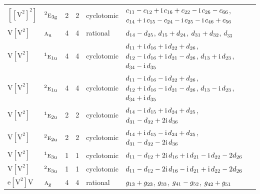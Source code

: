 \documentclass[10pt,a4paper]{article}
\numberwithin{equation}{section}
\newcommand{\irr}[1]{\text{\normalfont\scshape #1}}
\newcommand{\conjpair}[1]{{}^{#1}}
\newcommand{\ptag}[1]{\mathrm{#1}}
\newcommand{\iunit}{\mathrm{i}}
\newcommand{\jahn}[1]{\mathrm{#1}}
\newlength{\fillwidth}\newlength{\cellwidth}\newlength{\colwidth}
\newcommand{\signbreak}{\penalty100\relax}
\begin{document}
{\begin{longtable}{@{}llrrl>{\RaggedRight\arraybackslash}p{\fillwidth}@{}}
$\jahn{[[V^{2}]^{2}]}$ & $\conjpair{2}\irr{e}_{3\ptag{g}}$ & 2 & 2 & cyclotomic & $c_{11} -\signbreak c_{12} +\signbreak \iunit{}\,c_{16} +\signbreak c_{22} -\signbreak \iunit{}\,c_{26} -\signbreak c_{66}$, $c_{14} +\signbreak \iunit{}\,c_{15} -\signbreak c_{24} -\signbreak \iunit{}\,c_{25} -\signbreak \iunit{}\,c_{46} +\signbreak c_{56}$\\
$\jahn{V[V^{2}]}$ & $\irr{a}_{\ptag{u}}$ & 4 & 4 & rational & $d_{14} -\signbreak d_{25}$, $d_{15} +\signbreak d_{24}$, $d_{31} +\signbreak d_{32}$, $d_{33}$\\
$\jahn{V[V^{2}]}$ & $\conjpair{1}\irr{e}_{1\ptag{u}}$ & 4 & 4 & cyclotomic & $d_{11} +\signbreak \iunit{}\,d_{16} +\signbreak \iunit{}\,d_{22} +\signbreak d_{26}$, $d_{12} -\signbreak \iunit{}\,d_{16} +\signbreak \iunit{}\,d_{21} -\signbreak d_{26}$, $d_{13} +\signbreak \iunit{}\,d_{23}$, $d_{34} -\signbreak \iunit{}\,d_{35}$\\
$\jahn{V[V^{2}]}$ & $\conjpair{2}\irr{e}_{1\ptag{u}}$ & 4 & 4 & cyclotomic & $d_{11} -\signbreak \iunit{}\,d_{16} -\signbreak \iunit{}\,d_{22} +\signbreak d_{26}$, $d_{12} +\signbreak \iunit{}\,d_{16} -\signbreak \iunit{}\,d_{21} -\signbreak d_{26}$, $d_{13} -\signbreak \iunit{}\,d_{23}$, $d_{34} +\signbreak \iunit{}\,d_{35}$\\
$\jahn{V[V^{2}]}$ & $\conjpair{1}\irr{e}_{2\ptag{u}}$ & 2 & 2 & cyclotomic & $d_{14} -\signbreak \iunit{}\,d_{15} +\signbreak \iunit{}\,d_{24} +\signbreak d_{25}$, $d_{31} -\signbreak d_{32} +\signbreak 2\iunit{}\,d_{36}$\\
$\jahn{V[V^{2}]}$ & $\conjpair{2}\irr{e}_{2\ptag{u}}$ & 2 & 2 & cyclotomic & $d_{14} +\signbreak \iunit{}\,d_{15} -\signbreak \iunit{}\,d_{24} +\signbreak d_{25}$, $d_{31} -\signbreak d_{32} -\signbreak 2\iunit{}\,d_{36}$\\
$\jahn{V[V^{2}]}$ & $\conjpair{1}\irr{e}_{3\ptag{u}}$ & 1 & 1 & cyclotomic & $d_{11} -\signbreak d_{12} +\signbreak 2\iunit{}\,d_{16} +\signbreak \iunit{}\,d_{21} -\signbreak \iunit{}\,d_{22} -\signbreak 2d_{26}$\\
$\jahn{V[V^{2}]}$ & $\conjpair{2}\irr{e}_{3\ptag{u}}$ & 1 & 1 & cyclotomic & $d_{11} -\signbreak d_{12} -\signbreak 2\iunit{}\,d_{16} -\signbreak \iunit{}\,d_{21} +\signbreak \iunit{}\,d_{22} -\signbreak 2d_{26}$\\
$\jahn{e[V^{2}]V}$ & $\irr{a}_{\ptag{g}}$ & 4 & 4 & rational & $\mathnormal{g}_{13} +\signbreak \mathnormal{g}_{23}$, $\mathnormal{g}_{33}$, $\mathnormal{g}_{41} -\signbreak \mathnormal{g}_{52}$, $\mathnormal{g}_{42} +\signbreak \mathnormal{g}_{51}$\\

\end{longtable}}
\end{document}

